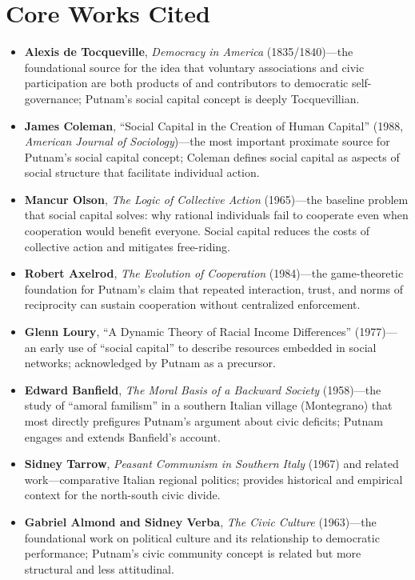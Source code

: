 \documentclass[12pt]{article}
\begin{document}
\section{Core Works Cited}

\begin{itemize}[leftmargin=*, itemsep=4pt]
    \item \textbf{Alexis de Tocqueville}, \textit{Democracy in America} (1835/1840)---the foundational source for the idea that voluntary associations and civic participation are both products of and contributors to democratic self-governance; Putnam's social capital concept is deeply Tocquevillian.
    \item \textbf{James Coleman}, ``Social Capital in the Creation of Human Capital'' (1988, \textit{American Journal of Sociology})---the most important proximate source for Putnam's social capital concept; Coleman defines social capital as aspects of social structure that facilitate individual action.
    \item \textbf{Mancur Olson}, \textit{The Logic of Collective Action} (1965)---the baseline problem that social capital solves: why rational individuals fail to cooperate even when cooperation would benefit everyone. Social capital reduces the costs of collective action and mitigates free-riding.
    \item \textbf{Robert Axelrod}, \textit{The Evolution of Cooperation} (1984)---the game-theoretic foundation for Putnam's claim that repeated interaction, trust, and norms of reciprocity can sustain cooperation without centralized enforcement.
    \item \textbf{Glenn Loury}, ``A Dynamic Theory of Racial Income Differences'' (1977)---an early use of ``social capital'' to describe resources embedded in social networks; acknowledged by Putnam as a precursor.
    \item \textbf{Edward Banfield}, \textit{The Moral Basis of a Backward Society} (1958)---the study of ``amoral familism'' in a southern Italian village (Montegrano) that most directly prefigures Putnam's argument about civic deficits; Putnam engages and extends Banfield's account.
    \item \textbf{Sidney Tarrow}, \textit{Peasant Communism in Southern Italy} (1967) and related work---comparative Italian regional politics; provides historical and empirical context for the north-south civic divide.
    \item \textbf{Gabriel Almond and Sidney Verba}, \textit{The Civic Culture} (1963)---the foundational work on political culture and its relationship to democratic performance; Putnam's civic community concept is related but more structural and less attitudinal.

\end{itemize}
\end{document}
